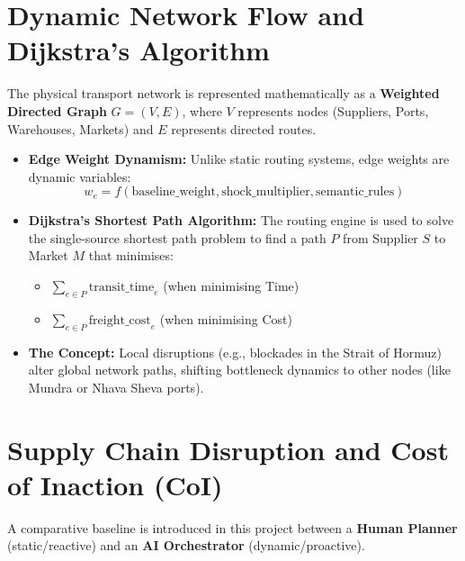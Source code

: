 \section{Dynamic Network Flow and Dijkstra's Algorithm}
The physical transport network is represented mathematically as a \textbf{Weighted Directed Graph} $G = (V, E)$, where $V$ represents nodes (Suppliers, Ports, Warehouses, Markets) and $E$ represents directed routes.

\begin{itemize}
    \item \textbf{Edge Weight Dynamism:} Unlike static routing systems, edge weights are dynamic variables:
    \begin{equation}
    w_{e} = f(\text{baseline\_weight}, \text{shock\_multiplier}, \text{semantic\_rules})
    \end{equation}
    \item \textbf{Dijkstra's Shortest Path Algorithm:} 
    The routing engine is used to solve the single-source shortest path problem to find a path $P$ from Supplier $S$ to Market $M$ that minimises:
    \begin{itemize}
        \item $\sum_{e \in P} \text{transit\_time}_e$ (when minimising Time)
        \item $\sum_{e \in P} \text{freight\_cost}_e$ (when minimising Cost)
    \end{itemize}
    \item \textbf{The Concept:} Local disruptions (e.g., blockades in the Strait of Hormuz) alter global network paths, shifting bottleneck dynamics to other nodes (like Mundra or Nhava Sheva ports).
\end{itemize}

\section{Supply Chain Disruption and Cost of Inaction (CoI)}
A comparative baseline is introduced in this project between a \textbf{Human Planner} (static/reactive) and an \textbf{AI Orchestrator} (dynamic/proactive).

